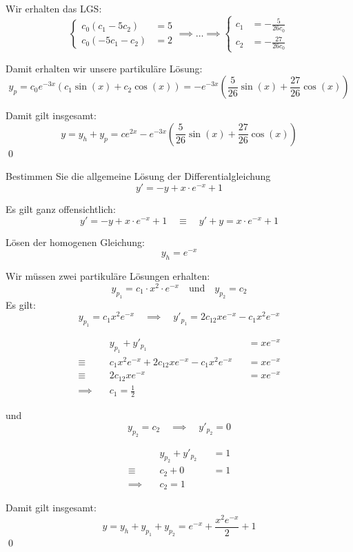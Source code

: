 \documentclass[answers]{exam}
\begin{document}
\begin{questions}
\begin{solution}
        Wir erhalten das LGS: 
        $$
        \begin{cases}
            c_0(c_1 -5c_2) & = 5 \\
            c_0(-5c_1 - c_2) & = 2
        \end{cases}
        \implies
        \ldots 
        \implies
        \begin{cases}
            c_1 & = -\frac{5}{26c_0} \\
            c_2 & = -\frac{27}{26c_0}
        \end{cases}
        $$

        Damit erhalten wir unsere partikuläre Lösung: 
        $$
        y_p = c_0e^{-3x}(c_1\sin(x) + c_2\cos(x)) = -e^{-3x}\left(\frac{5}{26}\sin(x) + \frac{27}{26}\cos(x)\right) 
        $$

        Damit gilt insgesamt: 
        $$
        y = y_h + y_p = ce^{2x} - e^{-3x}\left(\frac{5}{26}\sin(x) + \frac{27}{26}\cos(x)\right) 
        $$\qed
    \end{solution}

    \newpage 
    \question 
    Bestimmen Sie die allgemeine Lösung der Differentialgleichung 
    $$
    y' = -y + x\cdot e^{-x} + 1
    $$
    \begin{solution}
        Es gilt ganz offensichtlich:
        $$
        y' = -y + x\cdot e^{-x} + 1 \quad \equiv \quad y'  + y = x\cdot e^{-x} + 1
        $$

        Lösen der homogenen Gleichung: 
        $$
        y_h = e^{-x}
        $$

        Wir müssen zwei partikuläre Lösungen erhalten: 
        $$
        y_{p_1} = c_1 \cdot x^2 \cdot e^{-x} \quad \text{und} \quad y_{p_2} = c_2 
        $$
        Es gilt: 
        $$
        y_{p_1} = c_1 x^2  e^{-x} \quad \implies \quad y'_{p_1} = 2c_12xe^{-x} - c_1x^2e^{-x}
        $$

        $$
        \begin{aligned}
        &y_{p_1} + y'_{p_1} && = xe^{-x} \\
        \equiv \quad &c_1 x^2 e^{-x} + 2c_12xe^{-x} - c_1x^2e^{-x} && = xe^{-x} \\
        \equiv \quad &2c_12xe^{-x} && = xe^{-x} \\
        \implies \quad & c_1 = \frac{1}{2}
        \end{aligned}
        $$
        
        und
        $$
        y_{p_2} = c_2 \quad \implies \quad y'_{p_2} = 0
        $$

        $$
        \begin{aligned}
        &y_{p_2} + y'_{p_2} && = 1 \\
            \equiv \quad & c_2 + 0 && = 1 \\
            \implies \quad & c_2 = 1 
        \end{aligned}
        $$

        Damit gilt insgesamt: 
        $$
        y = y_h + y_{p_1} + y_{p_2} = e^{-x} + \frac{x^2e^{-x}}{2} + 1
        $$\qed
    \end{solution}
\end{questions}
\end{document}
